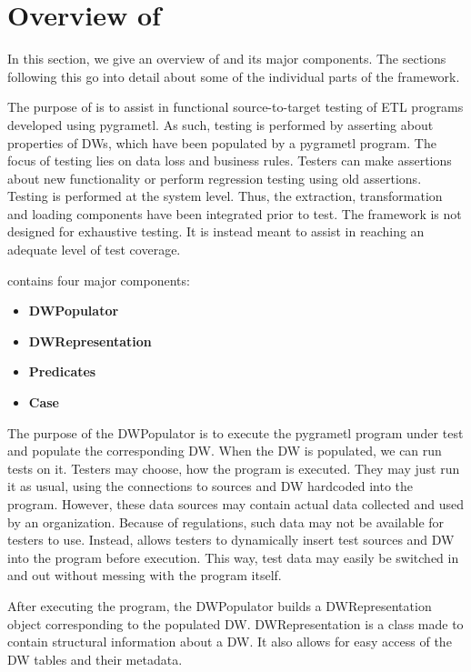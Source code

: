 \section{Overview of \FW{}}\label{sect:Overview}
In this section, we give an overview of \FW{} and its major components. The sections following this go into detail about some of the individual parts of the framework.

The purpose of \FW{} is to assist in functional source-to-target testing of ETL programs developed using pygrametl. As such, testing is performed by asserting about properties of DWs, which have been populated by a pygrametl program. The focus of testing lies on data loss and business rules. Testers can make assertions about new functionality or perform regression testing using old assertions. Testing is performed at the system level. Thus, the extraction, transformation and loading components have been integrated prior to test. The framework is not designed for exhaustive testing. It is instead meant to assist in reaching an adequate level of test coverage.

\FW{} contains four major components:
\begin{itemize}
\item\textbf{DWPopulator}
\item\textbf{DWRepresentation}
\item\textbf{Predicates}
\item\textbf{Case}
\end{itemize}

The purpose of the DWPopulator is to execute the pygrametl program under test and populate the corresponding DW. When the DW is populated, we can run tests on it.  Testers may choose, how the program is executed. They may just run it as usual, using the connections to sources and DW hardcoded into the program. However, these data sources may contain actual data collected and used by an organization. Because of regulations, such data may not be available for testers to use. Instead, \FW{} allows testers to dynamically insert test sources and DW into the program before execution. This way, test data may easily be switched in and out without messing with the program itself.  

After executing the program, the DWPopulator builds a DWRepresentation object corresponding to the populated DW. DWRepresentation is a class made to contain structural information about a DW. It also allows for easy access of the DW tables and their metadata.

